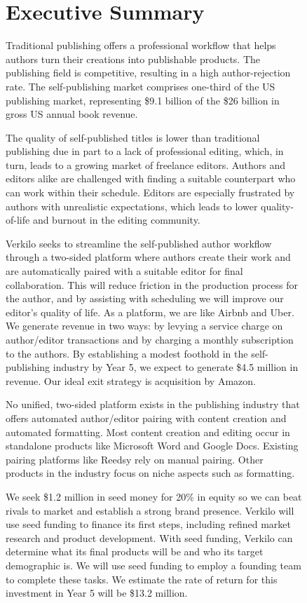 \documentclass[10pt,openany]{book}
\begin{document}
      \listoftables
  
      \listoffigures
  
\newpage %

\pagestyle{fancy}
\begin{figure}[hbt!]
\chapter{Executive Summary}
Traditional publishing offers a professional workflow that helps authors turn their creations into publishable products. The publishing field is competitive, resulting in a high author-rejection rate. The self-publishing market comprises one-third of the US publishing market, representing \$9.1 billion of the \$26 billion in gross US annual book revenue.

The quality of self-published titles is lower than traditional publishing due in part to a lack of professional editing, which, in turn, leads to a growing market of freelance editors. Authors and editors alike are challenged with finding a suitable counterpart who can work within their schedule. Editors are especially frustrated by authors with unrealistic expectations, which leads to lower quality-of-life and burnout in the editing community.

Verkilo seeks to streamline the self-published author workflow through a two-sided platform where authors create their work and are automatically paired with a suitable editor for final collaboration. This will reduce friction in the production process for the author, and by assisting with scheduling we will improve our editor’s quality of life. As a platform, we are like Airbnb and Uber. We generate revenue in two ways: by levying a service charge on author/editor transactions and by charging a monthly subscription to the authors. By establishing a modest foothold in the self-publishing industry by Year 5, we expect to generate \$4.5 million in revenue. Our ideal exit strategy is acquisition by Amazon.

No unified, two-sided platform exists in the publishing industry that offers automated author/editor pairing with content creation and automated formatting. Most content creation and editing occur in standalone products like Microsoft Word and Google Docs. Existing pairing platforms like Reedsy rely on manual pairing. Other products in the industry focus on niche aspects such as formatting.

We seek \$1.2 million in seed money for 20\% in equity so we can beat rivals to market and establish a strong brand presence. Verkilo will use seed funding to finance its first steps, including refined market research and product development. With seed funding, Verkilo can determine what its final products will be and who its target demographic is. We will use seed funding to employ a founding team to complete these tasks. We estimate the rate of return for this investment in Year 5 will be \$13.2 million.
\end{figure}
\end{document}
